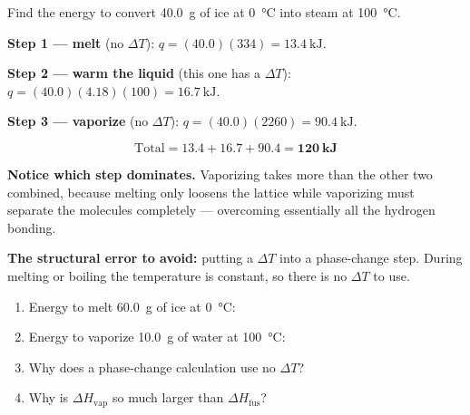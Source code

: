 \documentclass{apchem-worksheet}
\begin{document}
\begin{workedexample}
Find the energy to convert \SI{40.0}{\gram} of ice at \SI{0}{\celsius}
into steam at \SI{100}{\celsius}.

\textbf{Step 1 --- melt} (no $\Delta T$):
$q = (40.0)(334) = \SI{13.4}{\kilo\joule}$.

\textbf{Step 2 --- warm the liquid} (this one has a $\Delta T$):
$q = (40.0)(4.18)(100) = \SI{16.7}{\kilo\joule}$.

\textbf{Step 3 --- vaporize} (no $\Delta T$):
$q = (40.0)(2260) = \SI{90.4}{\kilo\joule}$.

\[ \text{Total} = 13.4 + 16.7 + 90.4 = \mathbf{120~kJ} \]

\textbf{Notice which step dominates.} Vaporizing takes more than the other
two combined, because melting only loosens the lattice while vaporizing
must separate the molecules completely --- overcoming essentially all the
hydrogen bonding.

\textbf{The structural error to avoid:} putting a $\Delta T$ into a
phase-change step. During melting or boiling the temperature is constant,
so there is no $\Delta T$ to use.
\end{workedexample}

\begin{yourturn}
\begin{enumerate}[leftmargin=*,itemsep=0.5em]
  \item Energy to melt \SI{60.0}{\gram} of ice at \SI{0}{\celsius}:
        \workspace[1.6cm]
  \item Energy to vaporize \SI{10.0}{\gram} of water at
        \SI{100}{\celsius}: \workspace[1.6cm]
  \item Why does a phase-change calculation use no $\Delta T$?
        \workspace[1.6cm]
  \item Why is $\Delta H_{\text{vap}}$ so much larger than
        $\Delta H_{\text{fus}}$? \workspace[1.8cm]
\end{enumerate}
\end{yourturn}
\end{document}
